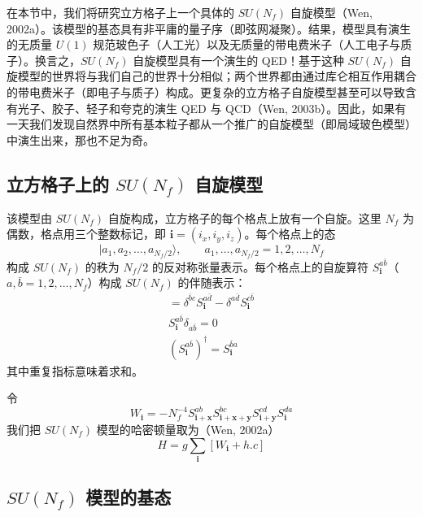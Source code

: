 在本节中，我们将研究立方格子上一个具体的 $SU(N_f)$ 自旋模型（Wen, 2002a）。该模型的基态具有非平庸的量子序（即弦网凝聚）。结果，模型具有演生的无质量 $U(1)$ 规范玻色子（人工光）以及无质量的带电费米子（人工电子与质子）。换言之，$SU(N_f)$ 自旋模型具有一个演生的 QED！基于这种 $SU(N_f)$ 自旋模型的世界将与我们自己的世界十分相似；两个世界都由通过库仑相互作用耦合的带电费米子（即电子与质子）构成。更复杂的立方格子自旋模型甚至可以导致含有光子、胶子、轻子和夸克的演生 QED 与 QCD（Wen, 2003b）。因此，如果有一天我们发现自然界中所有基本粒子都从一个推广的自旋模型（即局域玻色模型）中演生出来，那也不足为奇。

\subsection{立方格子上的 $SU(N_f)$ 自旋模型}

该模型由 $SU(N_f)$ 自旋构成，立方格子的每个格点上放有一个自旋。这里 $N_f$ 为偶数，格点用三个整数标记，即 $\pmb i=(i_x,i_y,i_z)$。每个格点上的态
\begin{equation*}
|a_1,a_2,\dots,a_{N_f/2}\rangle,\qquad a_1,\dots,a_{N_f/2}=1,2,\dots,N_f
\end{equation*}
构成 $SU(N_f)$ 的秩为 $N_f/2$ 的反对称张量表示。每个格点上的自旋算符 $S^{a\bar b}_{\pmb i}$（$a,\bar b=1,2,\dots,N_f$）构成 $SU(N_f)$ 的伴随表示：
\begin{gather*}
[S^{a\bar b}_{\pmb i},S^{c\bar d}_{\pmb i}]=\delta^{\bar b c}S^{a\bar d}_{\pmb i}-\delta^{a\bar d}S^{c\bar b}_{\pmb i}\\
S^{a\bar b}_{\pmb i}\delta_{a\bar b}=0\\
(S^{a\bar b}_{\pmb i})^{\dagger}=S^{\bar b a}_{\pmb i}\tag{10.7.1}
\end{gather*}
其中重复指标意味着求和。

令
\begin{equation*}
W_{\pmb i}=-N_f^{-4}S^{ab}_{\pmb i+\pmb x}S^{bc}_{\pmb i+\pmb x+\pmb y}S^{cd}_{\pmb i+\pmb y}S^{da}_{\pmb i}
\end{equation*}
我们把 $SU(N_f)$ 模型的哈密顿量取为（Wen, 2002a）
\begin{equation*}
H=g\sum_{\pmb i}[W_{\pmb i}+h.c]\tag{10.7.2}
\end{equation*}

\subsection{$SU(N_f)$ 模型的基态}

